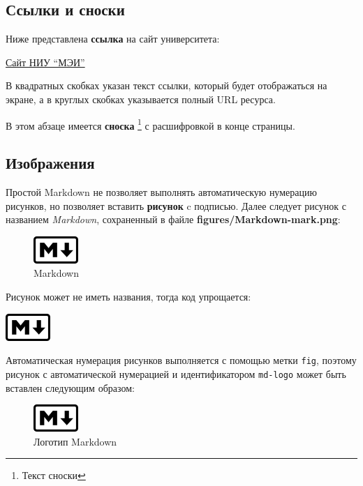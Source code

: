 \documentclass[
  a4paper,
]{book}
\theoremstyle{definition}
\theoremstyle{definition}
\theoremstyle{definition}
\theoremstyle{definition}
\theoremstyle{remark}
\begin{document}
\subsection{Ссылки и сноски}\label{markdown-syntax-links}

Ниже представлена \textbf{ссылка} на сайт университета:

\href{http://www.mpei.ru}{Сайт НИУ ``МЭИ''}

В квадратных скобках указан текст ссылки, который будет отображаться на экране, а в круглых скобках указывается полный URL ресурса.

В этом абзаце имеется \textbf{сноска} \footnote{Текст сноски} с расшифровкой в конце страницы.

\subsection{Изображения}\label{markdown-syntax-media}

Простой Markdown не позволяет выполнять автоматическую нумерацию рисунков, но позволяет вставить \textbf{рисунок} c подписью. Далее следует рисунок с названием \emph{Markdown}, сохраненный в файле \textbf{figures/Markdown-mark.png}:

\begin{figure}
\centering
\includegraphics{figures/Markdown-mark.png}
\caption{Markdown}
\end{figure}

Рисунок может не иметь названия, тогда код упрощается:

\includegraphics{figures/Markdown-mark.png}

Автоматическая нумерация рисунков выполняется с помощью метки \texttt{fig}, поэтому рисунок с автоматической нумерацией и идентификатором \texttt{md-logo} может быть вставлен следующим образом:

\begin{figure}
\centering
\includegraphics{figures/Markdown-mark.png}
\caption{\label{fig:md-logo} Логотип Markdown}
\end{figure}
\end{document}
